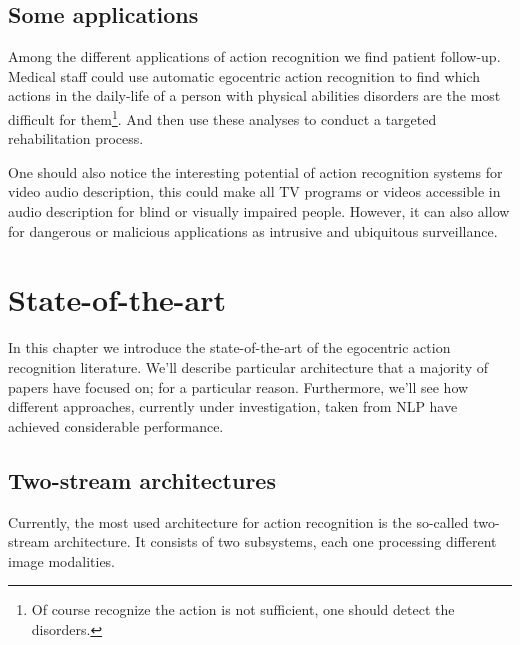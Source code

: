 \documentclass[12pt, a4paper]{report}
\begin{document}
				\subsection*{Some applications}
					Among the different applications of action recognition we find patient follow-up.
					Medical staff could use automatic egocentric action recognition to find which actions in the daily-life of a person with physical abilities disorders are the most difficult for them\footnote{Of course recognize the action is not sufficient, one should detect the disorders.}.
					And then use these analyses to conduct a targeted rehabilitation process.\par
					One should also notice the interesting potential of action recognition systems for video audio description, this could make all TV programs or videos accessible in audio description for blind or visually impaired people.
					However, it can also allow for dangerous or malicious applications as intrusive and ubiquitous surveillance.

		\section{State-of-the-art}
			In this chapter we introduce the state-of-the-art of the egocentric action recognition literature.
			We'll describe particular architecture that a majority of papers have focused on; for a particular reason.
			Furthermore, we'll see how different approaches, currently under investigation, taken from NLP have achieved considerable performance.
			
			\subsection{Two-stream architectures}\label{twostream}
				Currently, the most used architecture for action recognition is the so-called two-stream architecture.
				It consists of two subsystems, each one processing different image modalities.
\end{document}

